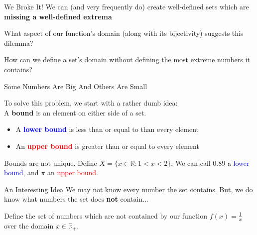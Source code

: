 \documentclass[10pt]{beamer}
\begin{document}
\begin{frame}{We Broke It!}
    We can (and very frequently do) create well-defined sets which are \textbf{missing a well-defined extrema} \\

    \vspace{1cm}

    What aspect of our function's domain (along with its bijectivity) suggests this dilemma?

    \vspace{1cm}

    How can we define a set's domain without defining the most extreme numbers it contains?
\end{frame}

\begin{frame}{Some Numbers Are Big And Others Are Small}

To solve this problem, we start with a rather dumb idea: \\
\vspace{1cm}
A \textbf{bound} is an element on either side of a set. \\
\vspace{.5cm}
\begin{itemize}
    \item A \textcolor{blue}{\textbf{lower bound}} is less than or equal to than every element
    \item An \textcolor{red}{\textbf{upper bound}} is greater than or equal to every element
\end{itemize}

\pause
Bounds are not unique. Define $X = \{x \in \mathbb{R}: 1 < x < 2\}$. We can call $0.89$ a \textcolor{blue}{lower bound}, and $\pi$ an \textcolor{red}{upper bound}.
    
\end{frame}

\begin{frame}{An Interesting Idea}
    We may not know every number the set contains. But, we do know what numbers the set does \textbf{not} contain... \\

    \vspace{1cm}

    Define the set of numbers which are not contained by our function $f(x) = \frac{1}{x}$ over the domain $x \in \mathbb{R}_+$.
\end{frame}
\end{document}
